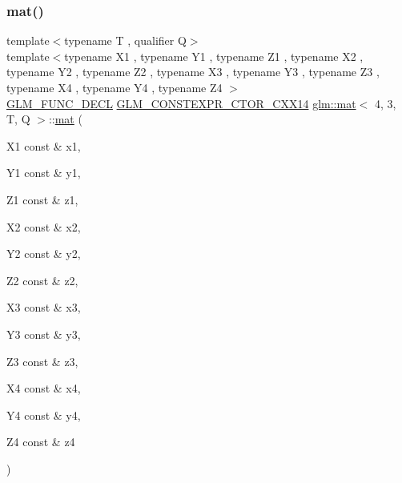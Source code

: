 \subsubsection{\texorpdfstring{mat()}{mat()}\hspace{0.1cm}{\footnotesize\ttfamily [7/21]}}
{\footnotesize\ttfamily template$<$typename T , qualifier Q$>$ \\
template$<$typename X1 , typename Y1 , typename Z1 , typename X2 , typename Y2 , typename Z2 , typename X3 , typename Y3 , typename Z3 , typename X4 , typename Y4 , typename Z4 $>$ \\
\hyperlink{setup_8hpp_ab2d052de21a70539923e9bcbf6e83a51}{G\+L\+M\+\_\+\+F\+U\+N\+C\+\_\+\+D\+E\+CL} \hyperlink{setup_8hpp_a0900f9145e68bf6061b6f5e7be3fa751}{G\+L\+M\+\_\+\+C\+O\+N\+S\+T\+E\+X\+P\+R\+\_\+\+C\+T\+O\+R\+\_\+\+C\+X\+X14} \hyperlink{structglm_1_1mat}{glm\+::mat}$<$ 4, 3, T, Q $>$\+::\hyperlink{structglm_1_1mat}{mat} (\begin{DoxyParamCaption}\item[{X1 const \&}]{x1,  }\item[{Y1 const \&}]{y1,  }\item[{Z1 const \&}]{z1,  }\item[{X2 const \&}]{x2,  }\item[{Y2 const \&}]{y2,  }\item[{Z2 const \&}]{z2,  }\item[{X3 const \&}]{x3,  }\item[{Y3 const \&}]{y3,  }\item[{Z3 const \&}]{z3,  }\item[{X4 const \&}]{x4,  }\item[{Y4 const \&}]{y4,  }\item[{Z4 const \&}]{z4 }\end{DoxyParamCaption})}

\mbox{\label{structglm_1_1mat_3_014_00_013_00_01_t_00_01_q_01_4_a066b9993b2c4aa5d755f83325b1e7870}} 
